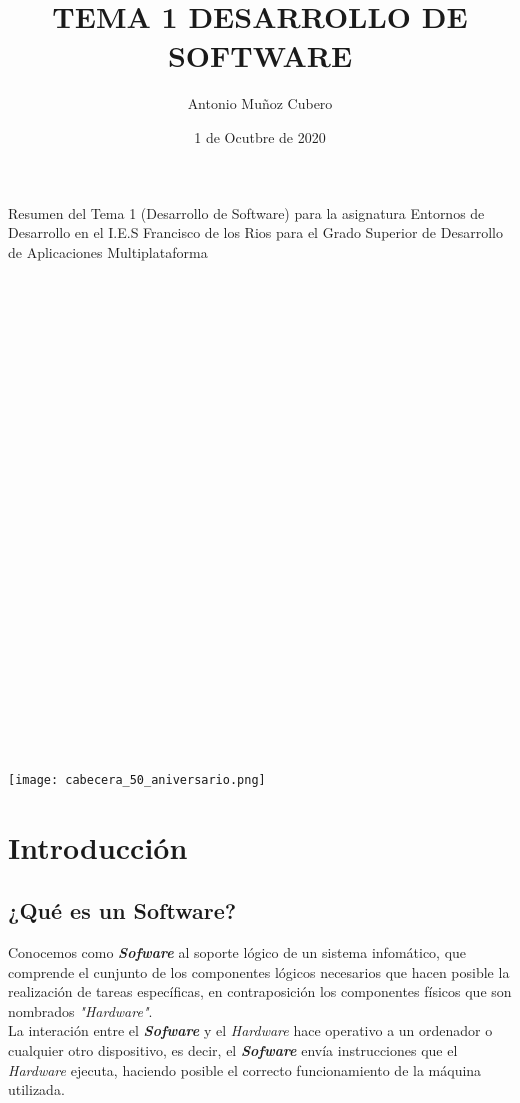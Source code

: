 \documentclass{article}
\title{TEMA 1 DESARROLLO DE SOFTWARE}
\author{Antonio Muñoz Cubero}
\date{1 de Ocutbre de 2020}
\begin{document}
\maketitle
{}


Resumen del Tema 1 (Desarrollo de Software) para la asignatura Entornos de Desarrollo en el 
I.E.S Francisco de los Rios para el Grado Superior de Desarrollo de Aplicaciones Multiplataforma
\\
\\
\\
\\
\\
\\
\\
\\
\\
\\
\\
\\
\\
\\
\\
\\
\\
\\
\\
\\
\\
\\
\\
\\
\\
\\
\\
\texttt{[image: cabecera\_50\_aniversario.png]}
\newpage
{}

\section{Introducción}
\subsection{¿Qué es un Software?}

Conocemos como \textbf{\textit{Sofware}} al soporte lógico de un sistema infomático, que comprende el cunjunto de los
componentes lógicos necesarios que hacen posible la realización de tareas específicas, en contraposición
los componentes físicos que son nombrados \textit{"Hardware"}.\\

La interación entre el \textbf{\textit{Sofware}} y el \textit{Hardware} hace operativo a un ordenador o cualquier otro 
dispositivo, es decir, el \textbf{\textit{Sofware}} envía instrucciones que el \textit{Hardware} ejecuta, haciendo posible 
el correcto funcionamiento de la máquina utilizada.\\
\end{document}
